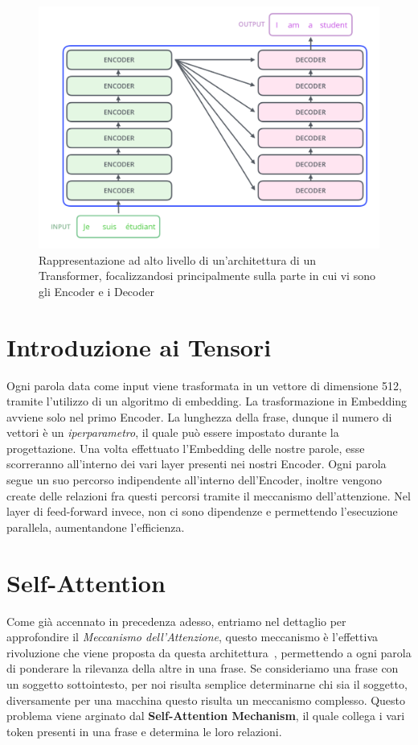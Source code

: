 \begin{figure}
    \centering
    \includegraphics[width=\textwidth]{figure/EncDecTransformers}
    \caption{Rappresentazione ad alto livello di un'architettura di un Transformer, focalizzandosi principalmente sulla parte in cui vi sono gli Encoder e i Decoder}
    \label{fig:EncDecTrasf}
\end{figure}

\section{Introduzione ai Tensori}

Ogni parola data come input viene trasformata in un vettore di dimensione 512, tramite l'utilizzo di un algoritmo di embedding. La trasformazione in Embedding avviene solo nel primo Encoder. La lunghezza della frase, dunque il numero di vettori è un \textit{iperparametro}, il quale può essere impostato durante la progettazione. Una volta effettuato l'Embedding delle nostre parole, esse scorreranno all'interno dei vari layer presenti nei nostri Encoder. Ogni parola segue un suo percorso indipendente all'interno dell'Encoder, inoltre vengono create delle relazioni fra questi percorsi tramite il meccanismo dell'attenzione. Nel layer di feed-forward invece, non ci sono dipendenze e permettendo l'esecuzione parallela, aumentandone l'efficienza.

\section{Self-Attention}

Come già accennato in precedenza adesso, entriamo nel dettaglio per approfondire il \textit{Meccanismo dell'Attenzione}, questo meccanismo è l'effettiva rivoluzione che viene proposta da questa architettura~\cite{vaswani2017attention}, permettendo a ogni parola di ponderare la rilevanza della altre in una frase. Se consideriamo una frase con un soggetto sottointesto, per noi risulta semplice determinarne chi sia il soggetto, diversamente per una macchina questo risulta un meccanismo complesso. Questo problema viene arginato dal \textbf{Self-Attention Mechanism}, il quale collega i vari token presenti in una frase e determina le loro relazioni.

